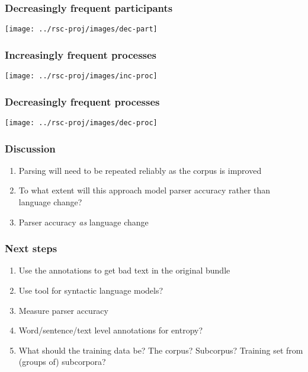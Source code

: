 \documentclass{beamer}       %
\begin{document}
\begin{frame}
    \frametitle{Decreasingly frequent participants}
    \centering
    \texttt{[image: ../rsc-proj/images/dec-part]}
\end{frame}

\begin{frame}
    \frametitle{Increasingly frequent processes}
    \centering
    \texttt{[image: ../rsc-proj/images/inc-proc]}
\end{frame}

\begin{frame}
    \frametitle{Decreasingly frequent processes}
    \centering
    \texttt{[image: ../rsc-proj/images/dec-proc]}
\end{frame}

\begin{frame}
\frametitle{Discussion}
\begin{enumerate}
    \item Parsing will need to be repeated reliably as the corpus is improved
    \item To what extent will this approach model parser accuracy rather than language change?
    \item Parser accuracy \emph{as} language change
\end{enumerate}
\end{frame}

\begin{frame}
\frametitle{Next steps}

\begin{enumerate}
    \item Use the annotations to get bad text in the original bundle
    \item Use tool for syntactic language models?
    \item Measure parser accuracy
    \item Word\slash sentence\slash text level annotations for entropy?
    \item What should the training data be? The corpus? Subcorpus? Training set from (groups of) subcorpora?
\end{enumerate}
\end{frame}
\end{document}
